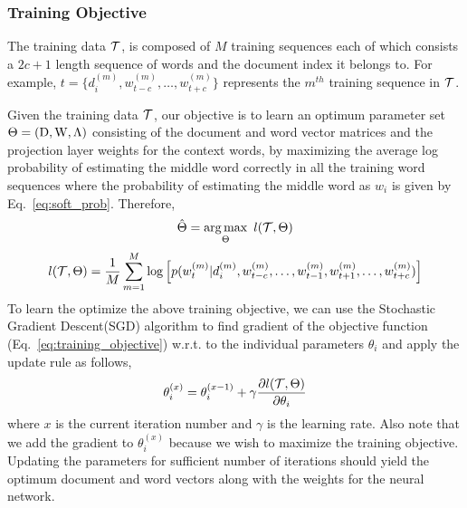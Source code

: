 \subsubsection{Training Objective}
The training data $\mathcal{T}$, is composed of $M$ training sequences each of which consists a $2c+1$ length sequence of words and the document index it belongs to. For example, $t = \{d^{(m)}_{i}, w^{(m)}_{t-c}, \ldots, w^{(m)}_{t+c}\}$ represents the $m^{th}$ training sequence in $\mathcal{T}$.  

Given the training data $\mathcal{T}$, our objective is to learn an optimum parameter set $\Theta = (\mathrm{D}, \mathrm{W}, \Lambda)$ consisting of the document and word vector matrices and the projection layer weights for the context words, by maximizing the average log probability of estimating the middle word correctly in all the training word sequences where the probability of estimating the middle word as $w_{i}$ is given by Eq.~\ref{eq:soft_prob}. Therefore, 
\begin{equation}
\label{eq:paramter_argmax}
\hat{\Theta} =  \operatorname*{arg\,max}_{\Theta}~l(\mathcal{T}, \Theta)
\end{equation}
\begin{equation}
\label{eq:training_objective}
l(\mathcal{T}, \Theta) = \frac{1}{M}\sum_{m=1}^{M} \log \left[p(w^{(m)}_{t} | d^{(m)}_{i}, w^{(m)}_{t-c}, \ldots, w^{(m)}_{t-1}, w^{(m)}_{t+1}, \ldots, w^{(m)}_{t+c})\right]
\end{equation}
To learn the optimize the above training objective, we can use the Stochastic Gradient Descent(SGD) algorithm to find gradient of the objective function (Eq.~\ref{eq:training_objective}) w.r.t. to the individual parameters $\theta_{i}$ and apply the update rule as follows,
\begin{equation}
\label{eq:update_theta}
\theta^{(x)}_{i} = \theta^{(x-1)}_{i} + \gamma\frac{\partial l(\mathcal{T}, \Theta)}{\partial \theta_{i}}
\end{equation}
where $x$ is the current iteration number and $\gamma$ is the learning rate. Also note that we add the gradient to $\theta^{(x)}_{i}$ because we wish to maximize the training objective.
Updating the parameters for sufficient number of iterations should yield the optimum document and word vectors along with the weights for the neural network.

